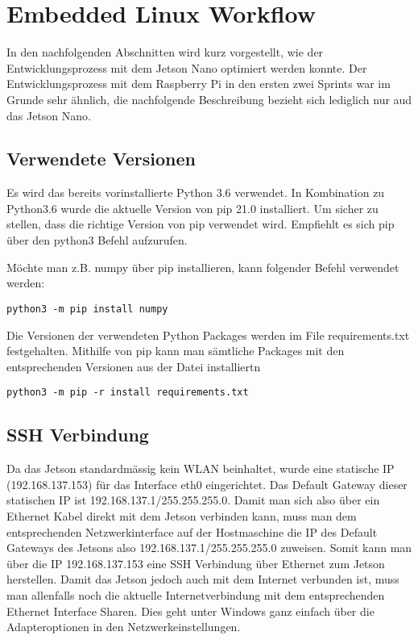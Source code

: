 \section{Embedded Linux Workflow}
In den nachfolgenden Abschnitten wird kurz vorgestellt, wie der Entwicklungsprozess mit dem Jetson Nano optimiert werden konnte. Der Entwicklungsprozess mit dem Raspberry Pi in den ersten zwei Sprints war im Grunde sehr ähnlich, die nachfolgende Beschreibung bezieht sich lediglich nur aud das Jetson Nano.

\subsection{Verwendete Versionen}
Es wird das bereits vorinstallierte Python 3.6 verwendet. In Kombination zu Python3.6 wurde die aktuelle Version von pip 21.0 installiert. Um sicher zu stellen, dass die richtige Version von pip verwendet wird. Empfiehlt es sich pip über den python3 Befehl aufzurufen.

Möchte man z.B. numpy über pip installieren, kann folgender Befehl verwendet werden:
\begin{verbatim}
python3 -m pip install numpy
\end{verbatim}

Die Versionen der verwendeten Python Packages werden im File requirements.txt festgehalten. Mithilfe von pip kann man sämtliche Packages mit den entsprechenden Versionen aus der Datei installiertn

\begin{verbatim}
python3 -m pip -r install requirements.txt
\end{verbatim}

\subsection{SSH Verbindung}
Da das Jetson standardmässig kein WLAN beinhaltet, wurde eine statische IP (192.168.137.153) für das Interface eth0 eingerichtet. Das Default Gateway dieser statischen IP ist 192.168.137.1/255.255.255.0. Damit man sich also über ein Ethernet Kabel direkt mit dem Jetson verbinden kann, muss man dem entsprechenden Netzwerkinterface auf der Hostmaschine die IP des Default Gateways des Jetsons also 192.168.137.1/255.255.255.0 zuweisen. Somit kann man über die IP 192.168.137.153 eine SSH Verbindung über Ethernet zum Jetson herstellen. Damit das Jetson jedoch auch mit dem Internet verbunden ist, muss man allenfalls noch die aktuelle Internetverbindung mit dem entsprechenden Ethernet Interface Sharen. Dies geht unter Windows ganz einfach über die Adapteroptionen in den Netzwerkeinstellungen.

